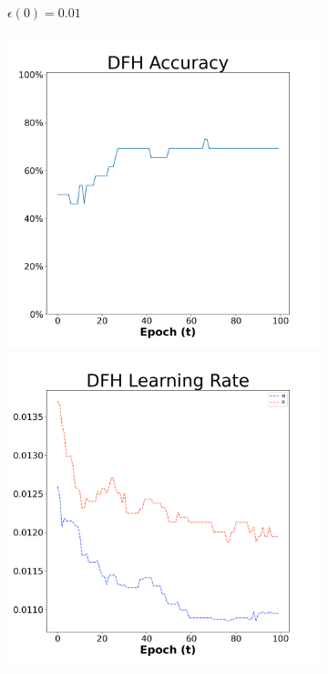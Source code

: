 \begin{figure}[H]
\begin{subfigure}{0.3\textwidth}
  \caption{$\epsilon(0)=0.01$}
\end{subfigure}\hfil %
\begin{subfigure}{0.3\textwidth}
  \includegraphics[width=\linewidth]{images/exper1/Sonar/DFH_0.03_acc.png}
  \includegraphics[width=\linewidth]{images/exper1/Sonar/DFH_0.03_lr.png}

\end{subfigure}
\end{figure}
